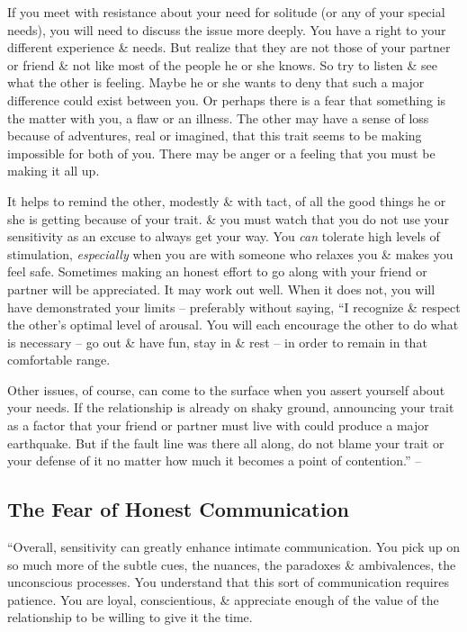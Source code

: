 \documentclass{article}
\numberwithin{equation}{section}
\begin{document}
If you meet with resistance about your need for solitude (or any of your special needs), you will need to discuss the issue more deeply. You have a right to your different experience \& needs. But realize that they are not those of your partner or friend \& not like most of the people he or she knows. So try to listen \& see what the other is feeling. Maybe he or she wants to deny that such a major difference could exist between you. Or perhaps there is a fear that something is the matter with you, a flaw or an illness. The other may have a sense of loss because of adventures, real or imagined, that this trait seems to be making impossible for both of you. There may be anger or a feeling that you must be making it all up.

It helps to remind the other, modestly \& with tact, of all the good things he or she is getting because of your trait. \& you must watch that you do not use your sensitivity as an excuse to always get your way. You \textit{can} tolerate high levels of stimulation, \textit{especially} when you are with someone who relaxes you \& makes you feel safe. Sometimes making an honest effort to go along with your friend or partner will be appreciated. It may work out well. When it does not, you will have demonstrated your limits -- preferably without saying, ``I recognize \& respect the other's optimal level of arousal. You will each encourage the other to do what is necessary -- go out \& have fun, stay in \& rest -- in order to remain in that comfortable range.

Other issues, of course, can come to the surface when you assert yourself about your needs. If the relationship is already on shaky ground, announcing your trait as a factor that your friend or partner must live with could produce a major earthquake. But if the fault line was there all along, do not blame your trait or your defense of it no matter how much it becomes a point of contention.'' -- \cite[pp. 186--187]{Aron2013}

\subsection{The Fear of Honest Communication}
``Overall, sensitivity can greatly enhance intimate communication. You pick up on so much more of the subtle cues, the nuances, the paradoxes \& ambivalences, the unconscious processes. You understand that this sort of communication requires patience. You are loyal, conscientious, \& appreciate enough of the value of the relationship to be willing to give it the time.
\end{document}
